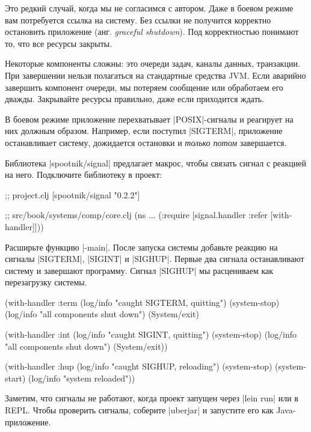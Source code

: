 Это редкий случай, когда мы не согласимся с автором. Даже в боевом режиме вам
потребуется ссылка на систему. Без ссылки не получится корректно остановить
приложение (анг. \emph{graceful shutdown}). Под корректностью понимают то, что
все ресурсы закрыты.

Некоторые компоненты сложны: это очереди задач, каналы данных, транзакции. При
завершении нельзя полагаться на стандартные средства JVM. Если аварийно
завершить компонент очереди, мы потеряем сообщение или обработаем его
дважды. Закрывайте ресурсы правильно, даже если приходится ждать.

В боевом режиме приложение перехватывает \spverb|POSIX|-сигналы и реагирует на
них должным образом. Например, если поступил \spverb|SIGTERM|, приложение
останавливает систему, дожидается остановки и \emph{только потом} завершается.

Библиотека \spverb|spootnik/signal|
предлагает макрос, чтобы связать сигнал с реакцией на него. Подключите
библиотеку в проект:

\begin{english}
  \begin{clojure}
;; project.clj
[spootnik/signal "0.2.2"]

;; src/book/systems/comp/core.clj
(ns ...
  (:require [signal.handler :refer [with-handler]]))
  \end{clojure}
\end{english}

Расширьте функцию \spverb|-main|. После запуска системы добавьте реакцию на
сигналы \spverb|SIGTERM|, \spverb|SIGINT| и \spverb|SIGHUP|. Первые два сигнала
останавливают систему и завершают программу. Сигнал \spverb|SIGHUP| мы
расцениваем как перезагрузку системы.

\begin{english}
  \begin{clojure}
(with-handler :term
  (log/info "caught SIGTERM, quitting")
  (system-stop)
  (log/info "all components shut down")
  (System/exit)

(with-handler :int
  (log/info "caught SIGINT, quitting")
  (system-stop)
  (log/info "all components shut down")
  (System/exit))

(with-handler :hup
  (log/info "caught SIGHUP, reloading")
  (system-stop)
  (system-start)
  (log/info "system reloaded"))
  \end{clojure}
\end{english}

Заметим, что сигналы не работают, когда проект запущен через \spverb|lein run|
или в REPL. Чтобы проверить сигналы, соберите \spverb|uberjar| и запустите его
как Java-приложение.

